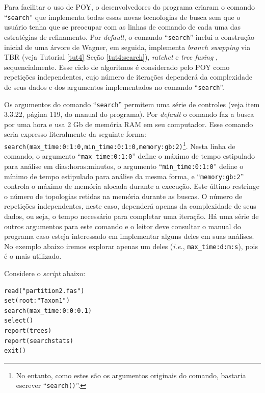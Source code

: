 \begin{refsection}
Para facilitar o uso de POY, o desenvolvedores do programa criaram o comando ``\texttt{search}'' que implementa todas essas novas tecnologias de busca sem que o usuário tenha que se preocupar com as linhas de comando de cada uma das estratégias de refinamento. Por \textit{default}, o comando ``\texttt{search}'' inclui a construção inicial de uma árvore de Wagner, em seguida, implementa \textit{branch swapping} via TBR (veja Tutorial \ref{tut4} Seção \ref{tut4:search}), \textit{ratchet} \parencite{Nixon_1999} e \textit{tree fusing} \parencite{Goloboff_1999}, sequencialmente. Esse ciclo de algoritmos é considerado pelo POY como repetições independentes, cujo número de iterações dependerá da complexidade de seus dados e dos argumentos implementados no comando ``\texttt{search}''.

Os argumentos do comando ``\texttt{search}'' permitem uma série de controles (veja item 3.3.22, página 119, do manual do programa). Por \textit{default} o comando faz a busca por uma hora e usa 2 Gb de memória RAM em seu computador. Esse comando seria expresso literalmente da seguinte forma: \texttt{search(max\_time:0:1:0,min\_time:0:1:0,memory:gb:2)}\footnote{ No entanto, como estes são os argumentos originais do comando, bastaria escrever ``\texttt{search()}''.}. Nesta linha de comando, o argumento ``\texttt{max\_time:0:1:0}'' define o máximo de tempo estipulado para análise em dias:horas:minutos, o argumento ``\texttt{min\_time:0:1:0}'' define o mínimo de tempo estipulado para análise da mesma forma, e ``\texttt{memory:gb:2}'' controla o máximo de memória alocada durante a execução. Este último restringe o número de topologias retidas na memória durante as buscas. O número de repetições independentes, neste caso, dependerá apenas da complexidade de seus dados, ou seja, o tempo necessário para completar uma iteração. Há uma série de outros argumentos para este comando e o leitor deve consultar o manual do programa caso esteja interessado em implementar alguns deles em suas análises. No exemplo abaixo iremos explorar apenas um deles (\textit{i.e.}, \texttt{max\_time:d:m:s}), pois é o mais utilizado.

	Considere o \textit{script} abaixo:


\begin{lstlisting}[caption= conteúdo do arquivo script1.poy (Tutorial \ref{tut10}),label=tut10:search:script1]
read("partition2.fas")
set(root:"Taxon1")
search(max_time:0:0:0.1)
select()
report(trees)
report(searchstats) 
exit()
\end{lstlisting}


\end{refsection}
